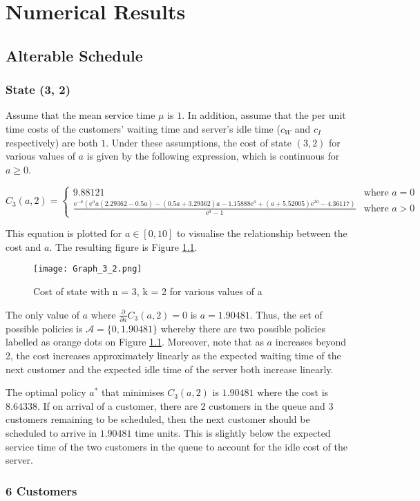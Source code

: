 \chapter{Numerical Results}

\section{Alterable Schedule}

\subsection{State (3, 2)}

Assume that the mean service time $\mu$ is $1$. In addition, assume that the per unit time costs of the customers' waiting time and server's idle time ($c_{W}$ and $c_{I}$ respectively) are both $1$. Under these assumptions, the cost of state $(3, 2)$ for various values of $a$ is given by the following expression, which is continuous for $a \geq 0$.

\begin{equation*}
	C_{3} (a, 2) =
	\begin{cases}
 		9.88121 & \text{where $a = 0$} \\
 		\frac{\mathrm{e}^{-a} \left( \mathrm{e}^{a} a (2.29362 - 0.5 a) - (0.5 a + 3.29362) a - 1.15888 \mathrm{e}^{a} + (a + 5.52005) \mathrm{e}^{2 a} - 4.36117 \right)}{\mathrm{e}^{a} - 1} & \text{where $a > 0$}
	\end{cases}
\end{equation*}

This equation is plotted for $a \in [0, 10]$ to visualise the relationship between the cost and $a$. The resulting figure is Figure \ref{Graph_3_2}.

\begin{figure}[h]
	\centering
	\texttt{[image: Graph\_3\_2.png]}
	\caption{Cost of state with n = 3, k = 2 for various values of a}
	\label{Graph_3_2}
\end{figure}

The only value of $a$ where $\frac{\partial}{\partial a} C_{3} (a, 2) = 0$ is $a = 1.90481$. Thus, the set of possible policies is $\mathcal{A} = \{ 0, 1.90481 \}$ whereby there are two possible policies labelled as orange dots on Figure \ref{Graph_3_2}. Moreover, note that as $a$ increases beyond 2, the cost increases approximately linearly as the expected waiting time of the next customer and the expected idle time of the server both increase linearly.

The optimal policy $a^{*}$ that minimises $C_{3} (a, 2)$ is $1.90481$ where the cost is $8.64338$. If on arrival of a customer, there are $2$ customers in the queue and $3$ customers remaining to be scheduled, then the next customer should be scheduled to arrive in $1.90481$ time units. This is slightly below the expected service time of the two customers in the queue to account for the idle cost of the server.

\subsection{6 Customers}